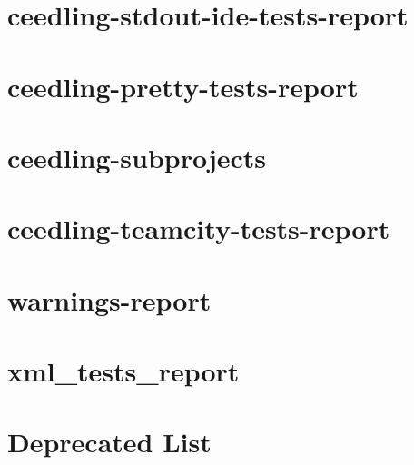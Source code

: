 \documentclass[twoside]{book}
\newcommand{\+}{\discretionary{\mbox{\scriptsize$\hookleftarrow$}}{}{}}
\begin{document}
\chapter{ceedling-\/stdout-\/ide-\/tests-\/report}
\label{md_muju_vendor_ceedling_plugins_stdout_ide_tests_report__r_e_a_d_m_e}

\chapter{ceedling-\/pretty-\/tests-\/report}
\label{md_muju_vendor_ceedling_plugins_stdout_pretty_tests_report__r_e_a_d_m_e}

\chapter{ceedling-\/subprojects}
\label{md_muju_vendor_ceedling_plugins_subprojects__r_e_a_d_m_e}

\chapter{ceedling-\/teamcity-\/tests-\/report}
\label{md_muju_vendor_ceedling_plugins_teamcity_tests_report__r_e_a_d_m_e}

\chapter{warnings-\/report}
\label{md_muju_vendor_ceedling_plugins_warnings_report__r_e_a_d_m_e}

\chapter{xml\+\_\+tests\+\_\+report}
\label{md_muju_vendor_ceedling_plugins_xml_tests_report__r_e_a_d_m_e}

\chapter{Deprecated List}
\label{deprecated}

\end{document}
